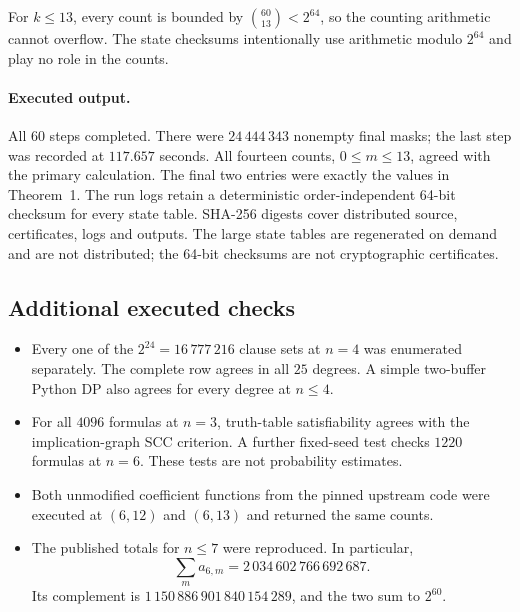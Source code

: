 \documentclass[11pt,a4paper]{article}
\begin{document}
For $k\le13$, every count is bounded by $\binom{60}{13}<2^{64}$, so the counting
arithmetic cannot overflow. The state checksums intentionally use arithmetic
modulo $2^{64}$ and play no role in the counts.

\paragraph{Executed output.}
All $60$ steps completed. There were $24\,444\,343$ nonempty final masks; the last
step was recorded at $117.657$ seconds. All fourteen counts, $0\le m\le13$,
agreed with the primary calculation. The final two entries were exactly the
values in Theorem~1. The run logs retain a deterministic order-independent
64-bit checksum for every state table. SHA-256 digests cover distributed source,
certificates, logs and outputs. The large state tables are regenerated on demand
and are not distributed; the 64-bit checksums are not cryptographic certificates.

\subsection{Additional executed checks}
\begin{itemize}
\item Every one of the $2^{24}=16\,777\,216$ clause sets at $n=4$ was enumerated
separately. The complete row agrees in all $25$ degrees. A simple two-buffer
Python DP also agrees for every degree at $n\le4$.
\item For all $4096$ formulas at $n=3$, truth-table satisfiability agrees with
the implication-graph SCC criterion. A further fixed-seed test checks $1220$
formulas at $n=6$. These tests are not probability estimates.
\item Both unmodified coefficient functions from the pinned upstream code were
executed at $(6,12)$ and $(6,13)$ and returned the same counts.
\item The published totals for $n\le7$ were reproduced. In particular,
\[\sum_m a_{6,m}=2\,034\,602\,766\,692\,687.\]
Its complement is
$1\,150\,886\,901\,840\,154\,289$, and the two sum to $2^{60}$.
\end{itemize}
\end{document}
